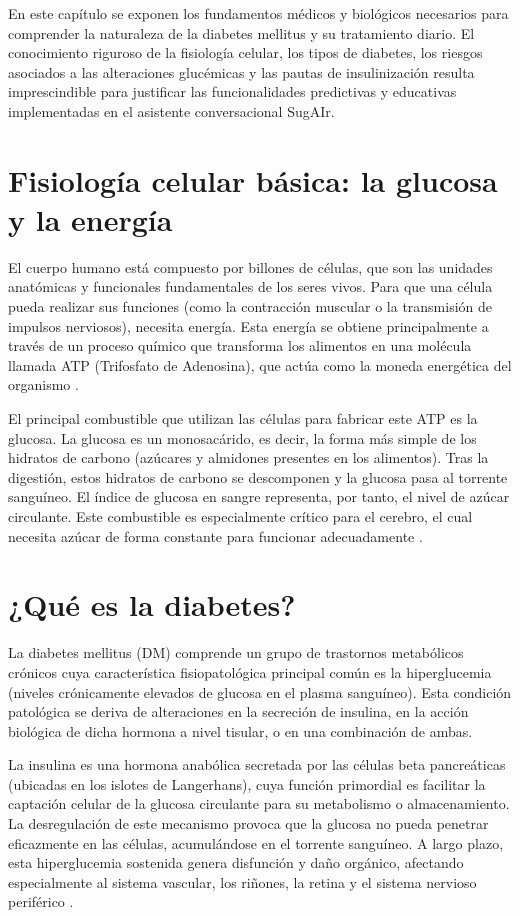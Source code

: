 
En este capítulo se exponen los fundamentos médicos y biológicos necesarios para comprender la naturaleza de la diabetes mellitus y su tratamiento diario. El conocimiento riguroso de la fisiología celular, los tipos de diabetes, los riesgos asociados a las alteraciones glucémicas y las pautas de insulinización resulta imprescindible para justificar las funcionalidades predictivas y educativas implementadas en el asistente conversacional SugAIr.

\section{Fisiología celular básica: la glucosa y la energía}
El cuerpo humano está compuesto por billones de células, que son las unidades anatómicas y funcionales fundamentales de los seres vivos. Para que una célula pueda realizar sus funciones (como la contracción muscular o la transmisión de impulsos nerviosos), necesita energía. Esta energía se obtiene principalmente a través de un proceso químico que transforma los alimentos en una molécula llamada ATP (Trifosfato de Adenosina), que actúa como la moneda energética del organismo \cite{medline_celula}.

El principal combustible que utilizan las células para fabricar este ATP es la glucosa. La glucosa es un monosacárido, es decir, la forma más simple de los hidratos de carbono (azúcares y almidones presentes en los alimentos). Tras la digestión, estos hidratos de carbono se descomponen y la glucosa pasa al torrente sanguíneo. El índice de glucosa en sangre representa, por tanto, el nivel de azúcar circulante. Este combustible es especialmente crítico para el cerebro, el cual necesita azúcar de forma constante para funcionar adecuadamente \cite{guyton2021}.

\section{¿Qué es la diabetes?}
La diabetes mellitus (DM) comprende un grupo de trastornos metabólicos crónicos cuya característica fisiopatológica principal común es la hiperglucemia (niveles crónicamente elevados de glucosa en el plasma sanguíneo). Esta condición patológica se deriva de alteraciones en la secreción de insulina, en la acción biológica de dicha hormona a nivel tisular, o en una combinación de ambas.

La insulina es una hormona anabólica secretada por las células beta pancreáticas (ubicadas en los islotes de Langerhans), cuya función primordial es facilitar la captación celular de la glucosa circulante para su metabolismo o almacenamiento. La desregulación de este mecanismo provoca que la glucosa no pueda penetrar eficazmente en las células, acumulándose en el torrente sanguíneo. A largo plazo, esta hiperglucemia sostenida genera disfunción y daño orgánico, afectando especialmente al sistema vascular, los riñones, la retina y el sistema nervioso periférico \cite{revespcardiol_diabetes}.

